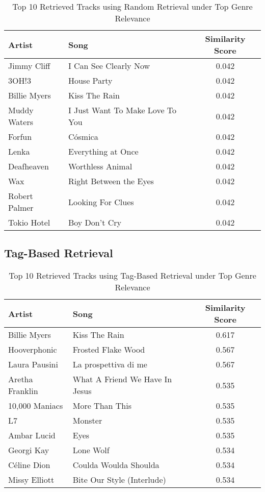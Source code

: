 \documentclass[sigconf]{acmart}
\begin{document}
\begin{table}[H]
    \centering
    \caption{Top 10 Retrieved Tracks using Random Retrieval under Top Genre Relevance}
    \label{tab:retrieved_random_top_genre_specific}
    \footnotesize
    \begin{tabular}{l l c}
        \toprule
        \textbf{Artist} & \textbf{Song} & \textbf{Similarity Score} \\
        \midrule
        Jimmy Cliff & I Can See Clearly Now & 0.042 \\
        3OH!3 & House Party & 0.042 \\
        Billie Myers & Kiss The Rain & 0.042 \\
        Muddy Waters & I Just Want To Make Love To You & 0.042 \\
        Forfun & Cósmica & 0.042 \\
        Lenka & Everything at Once & 0.042 \\
        Deafheaven & Worthless Animal & 0.042 \\
        Wax & Right Between the Eyes & 0.042 \\
        Robert Palmer & Looking For Clues & 0.042 \\
        Tokio Hotel & Boy Don't Cry & 0.042 \\
        \bottomrule
    \end{tabular}
\end{table}

\subsection{Tag-Based Retrieval}


\begin{table}[H]
    \centering
    \caption{Top 10 Retrieved Tracks using Tag-Based Retrieval under Top Genre Relevance}
    \label{tab:retrieved_tag_based_top_genre_specific}
    \footnotesize
    \begin{tabular}{l l c}
        \toprule
        \textbf{Artist} & \textbf{Song} & \textbf{Similarity Score} \\
        \midrule
        Billie Myers & Kiss The Rain & 0.617 \\
        Hooverphonic & Frosted Flake Wood & 0.567 \\
        Laura Pausini & La prospettiva di me & 0.567 \\
        Aretha Franklin & What A Friend We Have In Jesus & 0.535 \\
        10,000 Maniacs & More Than This & 0.535 \\
        L7 & Monster & 0.535 \\
        Ambar Lucid & Eyes & 0.535 \\
        Georgi Kay & Lone Wolf & 0.534 \\
        Céline Dion & Coulda Woulda Shoulda & 0.534 \\
        Missy Elliott & Bite Our Style (Interlude) & 0.534 \\
        \bottomrule
    \end{tabular}
\end{table}
\end{document}
